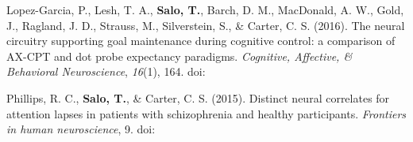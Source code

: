 \documentclass[10pt]{article}
\newcommand{\sectionstyle}{\LARGE \fontfamily{lmr}\selectfont}
\newcommand{\textlink}[3][blue]{\href{#2}{\color{#1}{#3}}}
\begin{document}
\begin{hangparas}{.25in}{1}
	\bigskip

	Lopez-Garcia, P., Lesh, T. A., \textbf{Salo, T.}, Barch, D. M., MacDonald,
	A. W., Gold, J., Ragland, J. D., Strauss, M., Silverstein, S., \& Carter, C. S.
	(2016). The neural circuitry supporting goal maintenance during cognitive
	control: a comparison of AX-CPT and dot probe expectancy paradigms.
	\emph{Cognitive, Affective, \& Behavioral Neuroscience}, \emph{16}(1), 164.
	doi:\textlink{https://doi.org/10.3758/s13415-015-0384-1}{10.3758/s13415-015-0384-1}

	\bigskip

	Phillips, R. C., \textbf{Salo, T.}, \& Carter, C. S. (2015). Distinct neural
	correlates for attention lapses in patients with schizophrenia and healthy
	participants. \emph{Frontiers in human neuroscience}, 9.
	doi:\textlink{https://doi.org/10.3389/fnhum.2015.00502}{10.3389/fnhum.2015.00502}

\end{hangparas}

\bigskip

\begin{center}\sectionstyle{PREPRINTS}\end{center}
\end{document}
